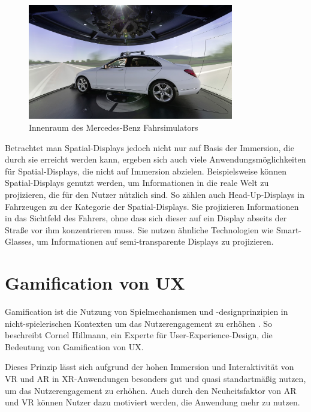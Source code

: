   \begin{figure}[H]
    \centering
    \includegraphics[width=0.8\textwidth]{images/merc-sim.png}
    \caption{Innenraum des Mercedes-Benz Fahrsimulators}
    \label{fig:merc-sim}
  \end{figure}

  Betrachtet man Spatial-Displays jedoch nicht nur auf Basis der Immersion, die durch sie erreicht werden kann, ergeben sich auch viele Anwendungsmöglichkeiten für Spatial-Displays, die nicht auf Immersion abzielen.
  Beispielsweise können Spatial-Displays genutzt werden, um Informationen in die reale Welt zu projizieren, die für den Nutzer nützlich sind.
  So zählen auch Head-Up-Displays in Fahrzeugen zu der Kategorie der Spatial-Displays.
  Sie projizieren Informationen in das Sichtfeld des Fahrers, ohne dass sich dieser auf ein Display abseits der Straße vor ihm konzentrieren muss.
  Sie nutzen ähnliche Technologien wie Smart-Glasses, um Informationen auf semi-transparente Displays zu projizieren.

  \newpage
  
\section{Gamification von UX}
\label{sec:gamification-ux}

\glqq{}Gamification ist die Nutzung von Spielmechanismen und -designprinzipien in nicht-spielerischen Kontexten um das Nutzerengagement zu erhöhen\grqq{} \autocite[][S.63]{hillmann2021ux}.
So beschreibt Cornel Hillmann, ein Experte für User-Experience-Design, die Bedeutung von Gamification von UX.

Dieses Prinzip lässt sich aufgrund der hohen Immersion und Interaktivität von VR und AR in XR-Anwendungen besonders gut und quasi standartmäßig nutzen, um das Nutzerengagement zu erhöhen.
Auch durch den Neuheitsfaktor von AR und VR können Nutzer dazu motiviert werden, die Anwendung mehr zu nutzen.

